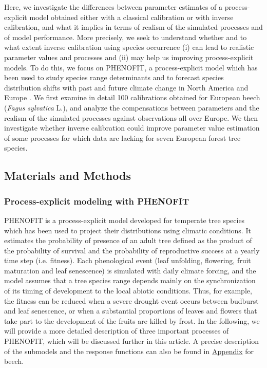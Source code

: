 Here, we investigate the differences between parameter estimates of a process-explicit model obtained either with a classical calibration or with inverse calibration, and what it implies in terms of realism of the simulated processes and of model performance. More precisely, we seek to understand whether and to what extent inverse calibration using species occurrence (i) can lead to realistic parameter values and processes and (ii) may help us improving process-explicit models. To do this, we focus on PHENOFIT, a process-explicit model which has been used to study species range determinants and to forecast species distribution shifts with past and future climate change in North America and Europe
\citep{Morin2007, Saltre2013, Saltre2015, Cheaib2012}. We first examine in detail 100 calibrations obtained for European beech (\emph{Fagus sylvatica} L.), and analyze the compensations between parameters and the realism of the simulated processes against observations all over Europe. We then investigate whether inverse calibration could improve parameter value estimation of some processes for which data are lacking for seven European forest tree species. 

\subsection{Materials and Methods}

\subsubsection{Process-explicit modeling with PHENOFIT}

PHENOFIT is a process-explicit model developed for temperate tree species which has been used to project their distributions using climatic conditions. It estimates the probability of presence of an adult tree defined as the product of the probability of survival and the probability of reproductive success at a yearly time step (i.e. fitness). 
Each phenological event (leaf unfolding, flowering, fruit maturation and leaf senescence) is simulated with daily climate forcing, and the model assumes that a tree species range depends mainly on the synchronization of its timing of development to the local abiotic conditions. Thus, for example, the fitness can be reduced when a severe drought event occurs between budburst and leaf senescence, or when a substantial proportions of leaves and flowers that take part to the development of the fruits are killed by frost. In the following, we will provide a more detailed description of three important processes of PHENOFIT, which will be discussed further in this article. A precise description of the submodels and the response functions can also be found in \hyperref[app:chapter3]{Appendix} for beech.

